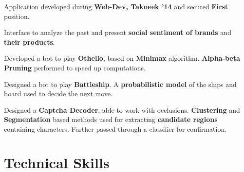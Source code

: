 \documentclass[a4paper]{norm-resume}
\begin{document}
	\vspace{2mm}
			
	   
	\begin{tightitemize}
	\small
	{
	\item Application developed during \textbf{Web-Dev, Takneek '14} and secured \textbf{First} position.
	\item Interface to analyze the past and present \textbf{social sentiment of brands} and \textbf{their products}.
	}
	\end{tightitemize}
 		
	\vspace{2mm}
	
			\descript{\null}
	\begin{tightitemize}
	\small
	{
	\item Developed a bot to play \textbf{Othello}, based on \textbf{Minimax} algorithm. \textbf{Alpha-beta Pruning} performed to speed up computations.
	\item Designed a bot to play \textbf{Battleship}. A \textbf{probabilistic model} of the ships and board used to decide the next move.
	\item Designed a \textbf{Captcha Decoder}, able to work with occlusions. \textbf{Clustering} and \textbf{Segmentation} based methods used for extracting \textbf{candidate regions} containing characters. Further passed through a classifier for confirmation.
	}
	\end{tightitemize}

\vspace{1mm}	%


\section{Technical Skills \hrulefill}

\vspace{1mm}	%

 \hfill {} \\
\vspace{1mm}	%
 \hfill {} \\
\vspace{1mm}	%
 \hfill {}
\end{document}
